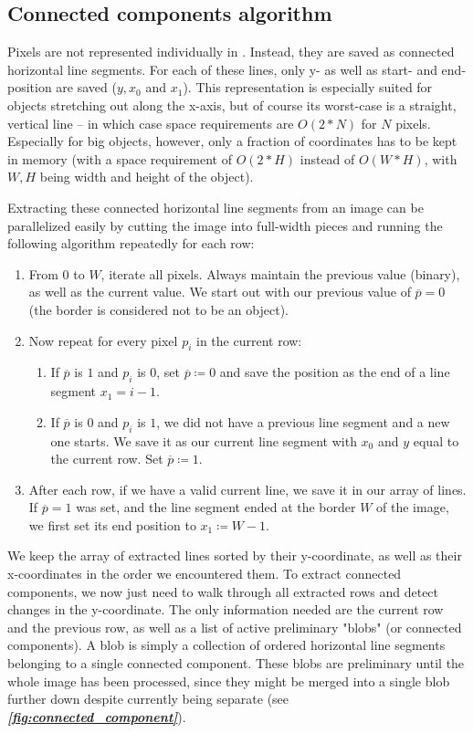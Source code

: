 \documentclass[9pt,lineno]{elife}
\newcommand{\figref}[1]{\textit{\textbf{\ref{#1}}}}
\newcommand{\TRex}{\protect\path{TRex}}
\begin{document}
\begin{appendixbox}
\section{Connected components algorithm} \label{sec:connected_components}
Pixels are not represented individually in \TRex{}. Instead, they are saved as connected horizontal line segments. For each of these lines, only y- as well as start- and end-position are saved ($y, x_0$ and $x_1$). This representation is especially suited for objects stretching out along the x-axis, but of course its worst-case is a straight, vertical line -- in which case space requirements are $O(2*N)$ for $N$ pixels. Especially for big objects, however, only a fraction of coordinates has to be kept in memory (with a space requirement of $O(2*H)$ instead of $O(W*H)$, with $W,H$ being width and height of the object).

Extracting these connected horizontal line segments from an image can be parallelized easily by cutting the image into full-width pieces and running the following algorithm repeatedly for each row:

\begin{enumerate}
    \item From $0$ to $W$, iterate all pixels. Always maintain the previous value (binary), as well as the current value. We start out with our previous value of $\overline{p}=0$ (the border is considered not to be an object).
    \item Now repeat for every pixel $p_i$ in the current row:
    \begin{enumerate}
        \item If $\overline{p}$ is $1$ and $p_i$ is $0$, set $\overline{p}\coloneqq 0$ and save the position as the end of a line segment $x_1=i-1$.
        \item If $\overline{p}$ is $0$ and $p_i$ is $1$, we did not have a previous line segment and a new one starts. We save it as our current line segment with $x_0$ and $y$ equal to the current row. Set $\overline{p}\coloneqq 1$.
    \end{enumerate}
    \item After each row, if we have a valid current line, we save it in our array of lines. If $\overline{p} = 1$ was set, and the line segment ended at the border $W$ of the image, we first set its end position to $x_1\coloneqq W-1$.
\end{enumerate}

We keep the array of extracted lines sorted by their y-coordinate, as well as their x-coordinates in the order we encountered them. To extract connected components, we now just need to walk through all extracted rows and detect changes in the y-coordinate. The only information needed are the current row and the previous row, as well as a list of active preliminary "blobs" (or connected components). A blob is simply a collection of ordered horizontal line segments belonging to a single connected component. These blobs are preliminary until the whole image has been processed, since they might be merged into a single blob further down despite currently being separate (see \figref{fig:connected_component}).


\end{appendixbox}
\end{document}
